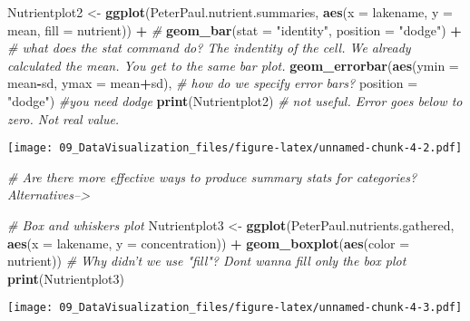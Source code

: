 \documentclass[]{article}
\newenvironment{Shaded}{\begin{snugshade}}{\end{snugshade}}
\newcommand{\KeywordTok}[1]{\textcolor[rgb]{0.13,0.29,0.53}{\textbf{#1}}}
\newcommand{\DataTypeTok}[1]{\textcolor[rgb]{0.13,0.29,0.53}{#1}}
\newcommand{\StringTok}[1]{\textcolor[rgb]{0.31,0.60,0.02}{#1}}
\newcommand{\CommentTok}[1]{\textcolor[rgb]{0.56,0.35,0.01}{\textit{#1}}}
\newcommand{\OperatorTok}[1]{\textcolor[rgb]{0.81,0.36,0.00}{\textbf{#1}}}
\newcommand{\NormalTok}[1]{#1}
\begin{document}
\begin{Shaded}
\begin{Highlighting}[]
\NormalTok{Nutrientplot2 <-}\StringTok{ }
\StringTok{  }\KeywordTok{ggplot}\NormalTok{(PeterPaul.nutrient.summaries, }\KeywordTok{aes}\NormalTok{(}\DataTypeTok{x =}\NormalTok{ lakename, }\DataTypeTok{y =}\NormalTok{ mean, }\DataTypeTok{fill =}\NormalTok{ nutrient)) }\OperatorTok{+}\StringTok{ }\CommentTok{#}
\StringTok{  }\KeywordTok{geom_bar}\NormalTok{(}\DataTypeTok{stat =} \StringTok{"identity"}\NormalTok{, }\DataTypeTok{position =} \StringTok{"dodge"}\NormalTok{) }\OperatorTok{+}\StringTok{ }\CommentTok{# what does the stat command do? The indentity of the cell. We already calculated the mean. You get to the same bar plot.}
\StringTok{  }\KeywordTok{geom_errorbar}\NormalTok{(}\KeywordTok{aes}\NormalTok{(}\DataTypeTok{ymin =}\NormalTok{ mean}\OperatorTok{-}\NormalTok{sd, }\DataTypeTok{ymax =}\NormalTok{ mean}\OperatorTok{+}\NormalTok{sd), }\CommentTok{# how do we specify error bars?}
                 \DataTypeTok{position =} \StringTok{"dodge"}\NormalTok{) }\CommentTok{#you need dodge}
\KeywordTok{print}\NormalTok{(Nutrientplot2) }\CommentTok{# not useful. Error goes below to zero. Not real value.}
\end{Highlighting}
\end{Shaded}

\texttt{[image: 09\_DataVisualization\_files/figure-latex/unnamed-chunk-4-2.pdf]}

\begin{Shaded}
\begin{Highlighting}[]
\CommentTok{# Are there more effective ways to produce summary stats for categories? Alternatives-->}

\CommentTok{# Box and whiskers plot}
\NormalTok{Nutrientplot3 <-}
\StringTok{  }\KeywordTok{ggplot}\NormalTok{(PeterPaul.nutrients.gathered, }\KeywordTok{aes}\NormalTok{(}\DataTypeTok{x =}\NormalTok{ lakename, }\DataTypeTok{y =}\NormalTok{ concentration)) }\OperatorTok{+}
\StringTok{  }\KeywordTok{geom_boxplot}\NormalTok{(}\KeywordTok{aes}\NormalTok{(}\DataTypeTok{color =}\NormalTok{ nutrient)) }\CommentTok{# Why didn't we use "fill"? Dont wanna fill only the box plot}
\KeywordTok{print}\NormalTok{(Nutrientplot3)}
\end{Highlighting}
\end{Shaded}

\texttt{[image: 09\_DataVisualization\_files/figure-latex/unnamed-chunk-4-3.pdf]}
\end{document}

